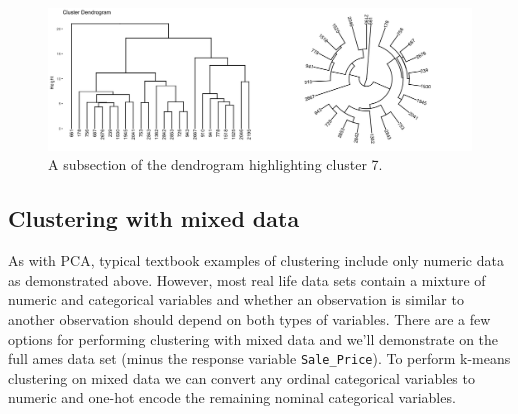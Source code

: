 \documentclass[]{book}
\newenvironment{Shaded}{\begin{snugshade}}{\end{snugshade}}
\newcommand{\CommentTok}[1]{\textcolor[rgb]{0.56,0.35,0.01}{\textit{#1}}}
\newcommand{\DataTypeTok}[1]{\textcolor[rgb]{0.13,0.29,0.53}{#1}}
\newcommand{\DecValTok}[1]{\textcolor[rgb]{0.00,0.00,0.81}{#1}}
\newcommand{\FloatTok}[1]{\textcolor[rgb]{0.00,0.00,0.81}{#1}}
\newcommand{\KeywordTok}[1]{\textcolor[rgb]{0.13,0.29,0.53}{\textbf{#1}}}
\newcommand{\NormalTok}[1]{#1}
\newcommand{\OperatorTok}[1]{\textcolor[rgb]{0.81,0.36,0.00}{\textbf{#1}}}
\newcommand{\StringTok}[1]{\textcolor[rgb]{0.31,0.60,0.02}{#1}}
\theoremstyle{definition}
\theoremstyle{definition}
\theoremstyle{definition}
\theoremstyle{remark}
\begin{document}
\begin{Shaded}
\end{Shaded}

\begin{figure}

{\centering \includegraphics[width=0.7\linewidth]{illustrations/cluster7_sub_dendrogram} 

}

\caption{A subsection of the dendrogram highlighting cluster 7.}\label{fig:zoom-into-dendrogram-plot}
\end{figure}

\hypertarget{clustering-with-mixed-data}{%
\subsection{Clustering with mixed
data}\label{clustering-with-mixed-data}}

As with PCA, typical textbook examples of clustering include only
numeric data as demonstrated above. However, most real life data sets
contain a mixture of numeric and categorical variables and whether an
observation is similar to another observation should depend on both
types of variables. There are a few options for performing clustering
with mixed data and we'll demonstrate on the full ames data set (minus
the response variable \texttt{Sale\_Price}). To perform k-means
clustering on mixed data we can convert any ordinal categorical
variables to numeric and one-hot encode the remaining nominal
categorical variables.
\end{document}
